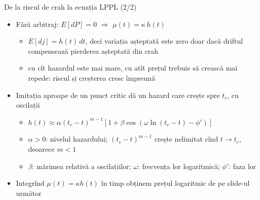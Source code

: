 \begin{frame}{De la riscul de crah la ecuația LPPL (2/2)}
\itemsize{\footnotesize}
\begin{itemize}
    \item Fără arbitraj: $E[dP] = 0$ $\Rightarrow$ $\mu(t) = \kappa\, h(t)$
    \begin{itemize}
        \item $E[dj] = h(t)\,dt$, deci variația așteptată este zero doar dacă driftul compensează pierderea așteptată din crah
        \item cu cît hazardul este mai mare, cu atît prețul trebuie să crească mai repede: riscul și creșterea cresc împreună
    \end{itemize}
    \item Imitația aproape de un punct critic dă un hazard care crește spre $t_c$, cu oscilații
    \begin{itemize}
        \item $h(t) \approx \alpha (t_c - t)^{m-1}[1 + \beta\cos(\omega \ln(t_c - t) - \phi')]$
        \item $\alpha > 0$: nivelul hazardului; $(t_c - t)^{m-1}$ crește nelimitat cînd $t \to t_c$, deoarece $m < 1$
        \item $\beta$: mărimea relativă a oscilațiilor; $\omega$: frecvența lor logaritmică; $\phi'$: faza lor
    \end{itemize}
    \item Integrînd $\mu(t) = \kappa h(t)$ în timp obținem prețul logaritmic de pe slide-ul următor
\end{itemize}
\end{frame}

